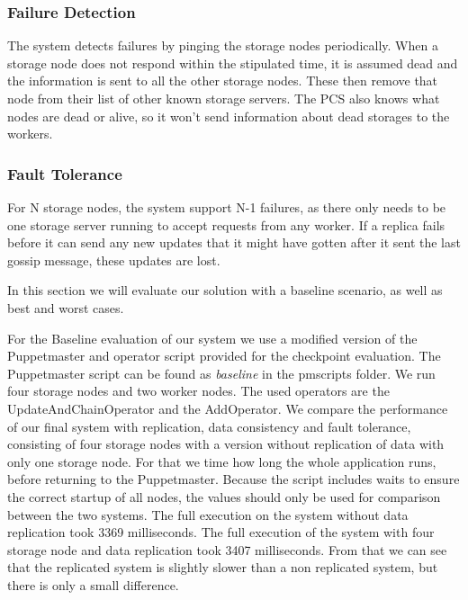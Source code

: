 \documentclass[times, 10pt,twocolumn]{article}
\begin{document}
\subsubsection{Failure Detection}

The system detects failures by pinging the storage nodes periodically. When a storage node does not respond within the stipulated time, it is assumed dead and the 
information is sent to all the other storage nodes. These then remove that node from their list of other known storage servers. The PCS also knows what nodes are dead or alive,
so it won't send information about dead storages to the workers.

\subsubsection{Fault Tolerance}

For N storage nodes, the system support N-1 failures, as there only needs to be one storage server running to accept requests from any worker.
If a replica fails before it can send any new updates that it might have gotten after it sent the last gossip message, these updates are lost.


In this section we will evaluate our solution with a baseline scenario, as well as best and worst cases.

For the Baseline evaluation of our system we use a modified version of the Puppetmaster and operator script provided for the checkpoint evaluation.
The Puppetmaster script can be found as \textit{baseline} in the pmscripts folder.
We run four storage nodes and two worker nodes.
The used operators are the UpdateAndChainOperator and the AddOperator.
We compare the performance of our final system with replication, data consistency and fault tolerance, consisting of four storage nodes with a version without replication of data with only one storage node.
For that we time how long the whole application runs, before returning to the Puppetmaster.
Because the script includes waits to ensure the correct startup of all nodes, the values should only be used for comparison between the two systems.
The full execution on the system without data replication took 3369 milliseconds.
The full execution of the system with four storage node and data replication took 3407 milliseconds.
From that we can see that the replicated system is slightly slower than a non replicated system, but there is only a small difference.
\end{document}
